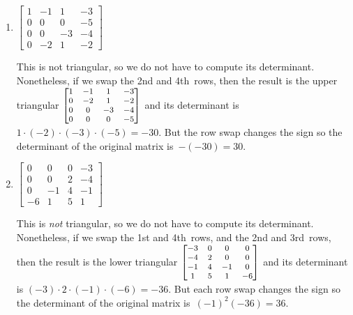 \begin{example}
\begin{enumerate}
\item \(\begin{bmatrix}1&-1&1&-3
\\0&0&0&-5
\\0&0&-3&-4
\\0&-2&1&-2\end{bmatrix}\)
\begin{solution} 
This is not triangular, so we do not have to compute its determinant. 
Nonetheless, if we swap the 2nd and 4th~rows, then the result is the upper triangular \(\footnotesize\begin{bmatrix}1&-1&1&-3
\\0&-2&1&-2
\\0&0&-3&-4
\\0&0&0&-5\end{bmatrix}\) and its determinant is \(1\cdot(-2)\cdot(-3)\cdot(-5)=-30\). 
But the row swap changes the sign so the determinant of the original matrix is~\(-(-30)=30\).
\end{solution}

\item \(\begin{bmatrix}0&0&0&-3
\\0&0&2&-4
\\0&-1&4&-1
\\-6&1&5&1\end{bmatrix}\)
\begin{solution} 
This is \emph{not} triangular, so we do not have to compute its determinant. 
Nonetheless, if we swap the 1st and 4th~rows, and the 2nd and 3rd~rows, then the result is the lower triangular \(\footnotesize\begin{bmatrix}-3&0&0&0
\\-4&2&0&0
\\-1&4&-1&0
\\1&5&1&-6\end{bmatrix}\) and its determinant is \((-3)\cdot2\cdot(-1)\cdot(-6)=-36\). 
But each row swap changes the sign so the determinant of the original matrix is~\((-1)^2(-36)=36\). 
\end{solution}


\end{enumerate}
\end{example}
